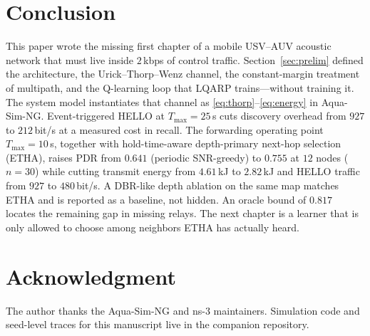 \documentclass[journal]{IEEEtran}
\begin{document}
\section{Conclusion}
\label{sec:concl}
This paper wrote the missing first chapter of a mobile USV--AUV
acoustic network that must live inside $2$\,kbps of control traffic.
Section~\ref{sec:prelim} defined the architecture, the
Urick--Thorp--Wenz channel, the constant-margin treatment of
multipath, and the Q-learning loop that LQARP trains---without
training it.
The system model instantiates that channel as
\eqref{eq:thorp}--\eqref{eq:energy} in Aqua-Sim-NG.
Event-triggered HELLO at $T_{\max}=25$\,s cuts discovery overhead from
$927$ to $212$\,bit/s at a measured cost in recall. The forwarding
operating point $T_{\max}=10$\,s, together with hold-time-aware
depth-primary next-hop selection (ETHA), raises PDR from $0.641$
(periodic SNR-greedy) to $0.755$ at $12$ nodes ($n=30$) while cutting
transmit energy from $4.61$\,kJ to $2.82$\,kJ and HELLO traffic from
$927$ to $480$\,bit/s. A DBR-like depth ablation on the same map
matches ETHA and is reported as a baseline, not hidden. An oracle
bound of $0.817$ locates the remaining gap in missing relays.
The next chapter is a learner that is only allowed to choose among
neighbors ETHA has actually heard.

\section*{Acknowledgment}
The author thanks the Aqua-Sim-NG and ns-3 maintainers. Simulation
code and seed-level traces for this manuscript live in the companion
repository.
\end{document}
